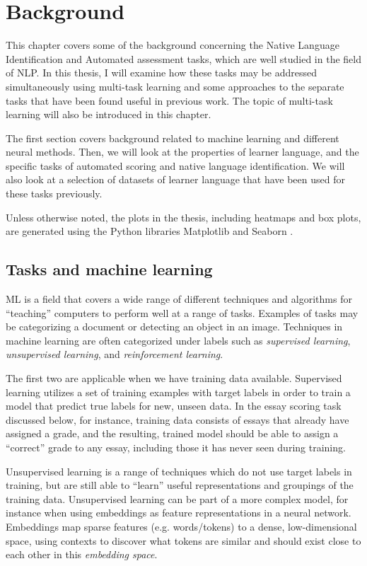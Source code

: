 \chapter{Background} \label{ch:background}

This chapter covers some of the background concerning the Native Language
Identification and Automated assessment tasks, which are well studied in the
field of \ac{NLP}. In this thesis, I will examine how these tasks
may be addressed simultaneously using multi-task learning and some approaches
to the separate tasks that have been found useful in previous work. The topic
of multi-task learning will also be introduced in this chapter.

The first section covers background related to machine learning and different
neural methods. Then, we will look at the properties of learner language, and
the specific tasks of automated scoring and native language identification.
We will also look at a selection of datasets of learner language that have
been used for these tasks previously.

Unless otherwise noted, the plots in the thesis, including heatmaps and box
plots, are generated using the Python libraries Matplotlib
\autocite{matplotlib} and Seaborn \autocite{seaborn}.


\section{Tasks and machine learning}

\ac{ML} is a field that covers a wide range of different
techniques and algorithms for ``teaching'' computers to perform well at a
range of tasks. Examples of tasks may be categorizing a document or detecting
an object in an image. Techniques in machine learning are often categorized
under labels such as \emph{supervised learning}, \emph{unsupervised
learning}, and \emph{reinforcement learning}.

The first two are applicable when we have training data available. Supervised
learning utilizes a set of training examples with target labels in order to
train a model that predict true labels for new, unseen data. In the essay
scoring task discussed below, for instance, training data consists of essays
that already have assigned a grade, and the resulting, trained model should
be able to assign a ``correct'' grade to any essay, including those it has
never seen during training.

Unsupervised learning is a range of techniques which do not use target labels
in training, but are still able to ``learn'' useful representations and
groupings of the training data. Unsupervised learning can be part of a more
complex model, for instance when using embeddings as feature representations
in a neural network. Embeddings map sparse features (e.g. words/tokens) to a
dense, low-dimensional space, using contexts to discover what tokens are
similar and should exist close to each other in this \emph{embedding space}.

